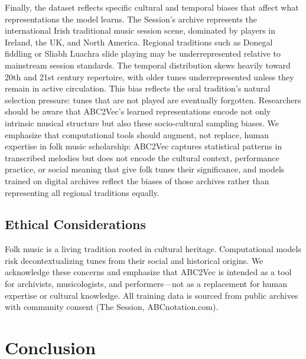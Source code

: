 \documentclass[]{interact}
\theoremstyle{plain}
\theoremstyle{definition}
\theoremstyle{remark}
\begin{document}
Finally, the dataset reflects specific cultural and temporal biases that affect what representations the model learns. The Session's archive represents the international Irish traditional music session scene, dominated by players in Ireland, the UK, and North America. Regional traditions such as Donegal fiddling or Sliabh Luachra slide playing may be underrepresented relative to mainstream session standards. The temporal distribution skews heavily toward 20th and 21st century repertoire, with older tunes underrepresented unless they remain in active circulation. This bias reflects the oral tradition's natural selection pressure: tunes that are not played are eventually forgotten. Researchers should be aware that ABC2Vec's learned representations encode not only intrinsic musical structure but also these socio-cultural sampling biases. We emphasize that computational tools should augment, not replace, human expertise in folk music scholarship: ABC2Vec captures statistical patterns in transcribed melodies but does not encode the cultural context, performance practice, or social meaning that give folk tunes their significance, and models trained on digital archives reflect the biases of those archives rather than representing all regional traditions equally.

\subsection{Ethical Considerations}

Folk music is a living tradition rooted in cultural heritage. Computational models risk decontextualizing tunes from their social and historical origins. We acknowledge these concerns and emphasize that ABC2Vec is intended as a tool for archivists, musicologists, and performers—not as a replacement for human expertise or cultural knowledge. All training data is sourced from public archives with community consent (The Session, ABCnotation.com).

\section{Conclusion}\label{sec:conclusion}
\end{document}
